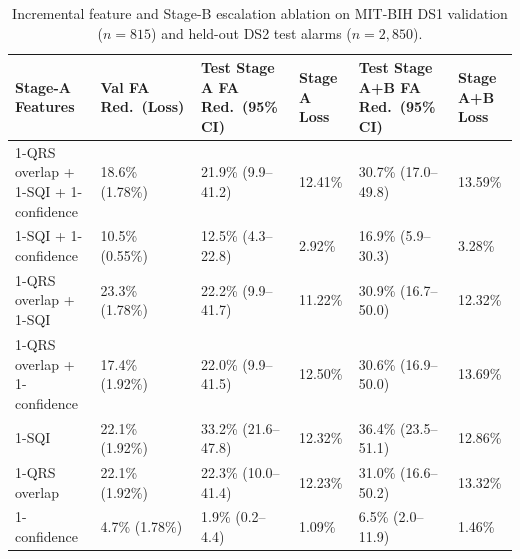\begin{table}[t]
\centering
\caption{Incremental feature and Stage-B escalation ablation on MIT-BIH DS1 validation ($n=815$) and held-out DS2 test alarms ($n=2{,}850$).}
\label{tab:stage_a_ablations}
\begin{tabular}{llllll}
\toprule
Stage-A Features & Val FA Red.\ (Loss) & Test Stage A FA Red.\ (95\% CI) & Stage A Loss & Test Stage A+B FA Red.\ (95\% CI) & Stage A+B Loss \\
\midrule
1-QRS overlap + 1-SQI + 1-confidence & 18.6\% (1.78\%) & 21.9\% (9.9--41.2) & 12.41\% & 30.7\% (17.0--49.8) & 13.59\% \\
1-SQI + 1-confidence & 10.5\% (0.55\%) & 12.5\% (4.3--22.8) & 2.92\% & 16.9\% (5.9--30.3) & 3.28\% \\
1-QRS overlap + 1-SQI & 23.3\% (1.78\%) & 22.2\% (9.9--41.7) & 11.22\% & 30.9\% (16.7--50.0) & 12.32\% \\
1-QRS overlap + 1-confidence & 17.4\% (1.92\%) & 22.0\% (9.9--41.5) & 12.50\% & 30.6\% (16.9--50.0) & 13.69\% \\
1-SQI & 22.1\% (1.92\%) & 33.2\% (21.6--47.8) & 12.32\% & 36.4\% (23.5--51.1) & 12.86\% \\
1-QRS overlap & 22.1\% (1.92\%) & 22.3\% (10.0--41.4) & 12.23\% & 31.0\% (16.6--50.2) & 13.32\% \\
1-confidence & 4.7\% (1.78\%) & 1.9\% (0.2--4.4) & 1.09\% & 6.5\% (2.0--11.9) & 1.46\% \\
\bottomrule
\end{tabular}
\end{table}